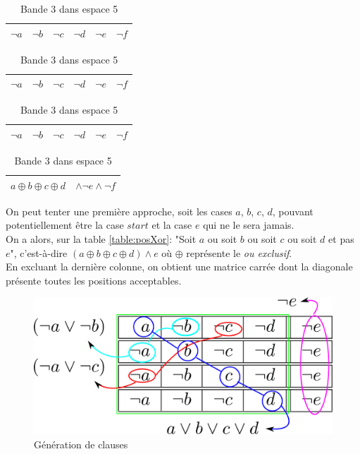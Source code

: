 \documentclass[a4paper,12pt]{report}
\newcommand\black{\cellcolor{black}}
\newcommand\grey{\cellcolor{black!50}}
\begin{document}
\begin{table}[H]
\begin{subtable}[B]{0.5\textwidth}
			\begin{tabular}{|c|c|c|c||c|c|}
			\hline 
			$\lnot a$ & \grey \color{gray}$\lnot$\color{white}$b$ & \black \color{white}$\lnot c$ &
			\black \color{white}$\lnot d$  & $\lnot e$ & $\lnot f$\\ 
			\hline
			\end{tabular}
			
			\begin{tabular}{|c|c|c|c||c|c|}
			\hline 
			$\lnot a$ & $\lnot b$ &\grey \color{gray}$\lnot$\color{white}$c$ & 
			\black \color{white}$\lnot d$ &\black \color{white}$\lnot e$  & $\lnot f$\\ 
			\hline
			\end{tabular}

			\begin{tabular}{|c|c|c|c||c|c|}
			\hline 
			$\lnot a$ & $\lnot b$ & $\lnot c$  &\grey \color{gray}$\lnot$\color{white}$d$ & 
			\black \color{white}$\lnot e$ &\black \color{white}$\lnot f$  \\ 
			\hline
			\end{tabular}

			\begin{tabular}{|c c c c c c|}
			\hline 
			\multicolumn{4}{|c||}{$a \oplus b \oplus c \oplus d$} & \multicolumn{2}{c|}{$\wedge \lnot e \wedge \lnot f$} \\ 
			\hline
			\end{tabular}			
			
        \caption{Bande 3 dans espace 5}
        \label{table:tailleE}
    \end{subtable}
\end{table}

On peut tenter une première approche, soit les cases $a$, $b$, $c$, $d$, pouvant potentiellement être la case $start$ et la case $e$ qui ne le sera jamais. \\
On a alors, sur la table \ref{table:posXor}: "Soit $a$ ou soit $b$ ou soit $c$ ou soit $d$ et pas $e$", c'est-à-dire $(a \oplus b \oplus c \oplus d) \wedge e$ où $\oplus$ représente le \textit{ou exclusif}.\\

En excluant la dernière colonne, on obtient une matrice carrée dont la diagonale présente toutes les positions acceptables. \\
\begin{figure}[H]
\centering
\includegraphics[scale=0.3]{generationFNC.png}
\caption{Génération de clauses}
\label{fig:generationFNC}
\end{figure}
\end{document}
